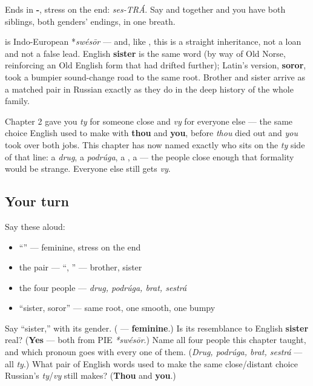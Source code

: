 Ends in \textbf{-}, stress on the end: \emph{ses-TRÁ}. Say \emph{} and \emph{} together and you have both siblings, both genders' endings, in one breath.

\begin{cousinweb}
\textbf{} is Indo-European *\emph{swésōr} — and, like \emph{}, this is a straight inheritance, not a loan and not a false lead. English \textbf{sister} is the same word (by way of Old Norse, reinforcing an Old English form that had drifted further); Latin's version, \textbf{soror}, took a bumpier sound-change road to the same root. Brother and sister arrive as a matched pair in Russian exactly as they do in the deep history of the whole family.
\end{cousinweb}

\begin{grammarlens}[title={Grammar Lens: who gets \emph{ty}}]
Chapter 2 gave you \emph{ty} for someone close and \emph{vy} for everyone else — the same choice English used to make with \textbf{thou} and \textbf{you}, before \emph{thou} died out and \emph{you} took over both jobs. This chapter has now named exactly who sits on the \emph{ty} side of that line: a \emph{drug}, a \emph{podrúga}, a \textbf{}, a \textbf{} — the people close enough that formality would be strange. Everyone else still gets \emph{vy}.
\end{grammarlens}

\subsection*{Your turn}
Say these aloud:

\begin{itemize}
\raggedright
  \item \textquotedblleft{}\textquotedblright{} — feminine, stress on the end
  \item the pair — \textquotedblleft{}, \textquotedblright{} — brother, sister
  \item the four people — \emph{drug, podrúga, brat, sestrá}
  \item \textquotedblleft{}sister, soror\textquotedblright{} — same root, one smooth, one bumpy
\end{itemize}

\begin{tcolorbox}[breakable,colback=teal!4,colframe=teal!35!black,title={Before you move on}]
Say \textquotedblleft{}sister,\textquotedblright{} with its gender. (\textbf{} — \textbf{feminine}.) Is its resemblance to English \textbf{sister} real? (\textbf{Yes} — both from PIE \emph{*swésōr}.) Name all four people this chapter taught, and which pronoun goes with every one of them. (\emph{Drug, podrúga, brat, sestrá} — all \emph{ty}.) What pair of English words used to make the same close/distant choice Russian's \emph{ty}/\emph{vy} still makes? (\textbf{Thou} and \textbf{you}.)
\end{tcolorbox}
